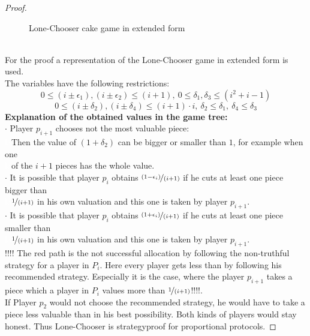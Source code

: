 \begin{proof}
\begin{figure}[h!]
\begin{center}
	\caption{Lone-Chooser cake game in extended form}
\end{center}
\end{figure}
\\
For the proof a representation of the Lone-Chooser game in extended form is used.\\The variables have the following restrictions: $$ 0 \leq (i\pm\epsilon_1),(i\pm\epsilon_2) \leq (i+1),\: 0 \leq \delta_1,\delta_3 \leq (i^2+i-1)$$$$0 \leq (i\pm\delta_2),(i\pm\delta_4) \leq (i+1)\cdot i,\:\delta_2 \leq \delta_1,\: \delta_4 \leq \delta_3$$
\newline
\textbf{Explanation of the obtained values in the game tree:}\\
\newline
$\cdot$ Player $p_{i+1}$ chooses not the most valuable piece:\\\textcolor{white}{la}\textcolor{black}{}Then the value of $(1+\delta_2)$ can be bigger or smaller than $1$, for example when one\\\textcolor{white}{la}\textcolor{black}{}of the $i+1$ pieces has the whole value.\\
$\cdot$ It is possible that player $p_i$ obtains $\nicefrac{(1-\epsilon_i)}{(i+1)}$ if he cuts at least one piece bigger than\\\textcolor{white}{la}\textcolor{black}{}$\nicefrac{1}{(i+1)}$ in his own valuation and this one is taken by player $p_{i+1}$.
\\$\cdot$ It is possible that player $p_i$ obtains $\nicefrac{(1+\epsilon_i)}{(i+1)}$ if he cuts at least one piece smaller than\\\textcolor{white}{la}\textcolor{black}{}$\nicefrac{1}{(i+1)}$ in his own valuation and this one is taken by player $p_{i+1}$.\\
\newline
!!!!
The red path is the not successful allocation by following the non-truthful strategy for a player in $P_i$. Here every player gets less than by following his recommended strategy. Especially it is the case, where the player $p_{i+1}$ takes a piece which a player in $P_i$ values more than $\nicefrac{1}{(i+1)}$!!!!.\\If Player $p_2$ would not choose the recommended strategy, he would have to take a piece less valuable than in his best possibility. Both kinds of players would stay honest. Thus Lone-Chooser is strategyproof for proportional protocols.
\end{proof}	 
